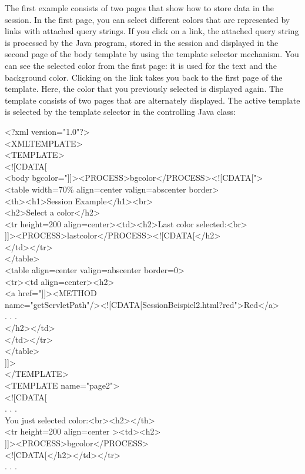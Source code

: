 The first example consists of two pages that show how to store data in
the session. In the first page, you can select different colors that
are represented by links with attached query strings. If you click on a
link, the attached query string is processed by the Java program, stored
in the session and displayed in the second page of the body template by
using the template selector mechanism. You can see the selected color
from the first page: it is used for the text and the background color.
Clicking on the link takes you back to the first page of the template.
Here, the color that you previously selected is displayed again.
The template consists of two pages that are alternately displayed. The
active template is selected by the template selector in the controlling
Java class:

\begin{java}
<?xml version="1.0"?>\\
<XMLTEMPLATE>\\
<TEMPLATE>\\
<![CDATA[\\
<body bgcolor="]]><PROCESS>bgcolor</PROCESS><![CDATA[">\\
<table width=70\% align=center valign=abscenter border>\\
<th><h1>Session Example</h1><br>\\
<h2>Select a color</h2>\\
<tr height=200 align=center><td><h2>Last color selected:<br>\\
]]><PROCESS>lastcolor</PROCESS><![CDATA[</h2>\\
</td></tr>\\
</table>\\
<table align=center valign=abscenter border=0>\\
<tr><td align=center><h2>\\
\jtabc        <a href="]]><METHOD\\
name="getServletPath"/><![CDATA[SessionBeispiel2.html?red">Red</a>\\
. . .\\
\jtabc        </h2></td>\\
</td></tr>\\
</table>\\
]]>\\
</TEMPLATE>\\
<TEMPLATE name="page2">\\
<![CDATA[\\
\jtabb     . . .\\
You just selected color:<br><h2></th>\\
\jtabc        <tr height=200 align=center ><td><h2>\\
\jtabc        ]]><PROCESS>bgcolor</PROCESS>\\
\jtabc        <![CDATA[</h2></td></tr>\\
\jtabb     . . .\\
\end{java}

